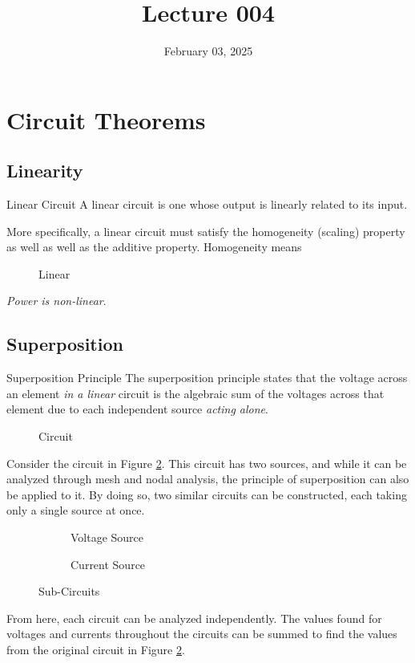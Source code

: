 \documentclass[12pt]{article}
\title{Lecture 004}
\date{February 03, 2025}
\begin{document}
\newpage
\section{Circuit Theorems}
\label{sec:circuitTheorems}

\subsection{Linearity}
\label{ssec:linearity}

\begin{definition}{Linear Circuit}
  A linear circuit is one whose output is linearly related to its input.
\end{definition}

More specifically, a linear circuit must satisfy the homogeneity (scaling) property as well as well as the additive property. Homogeneity means

\begin{figure}[H]
  
  \caption{Linear}
  \label{fig:}
\end{figure}

\textit{Power is non-linear}.

\subsection{Superposition}
\label{ssec:superposition}

\begin{definition}{Superposition Principle}
  The superposition principle states that the voltage across an element \textit{in a linear} circuit is the algebraic sum of the voltages across that element due to each independent source \textit{acting alone}.
\end{definition}

\begin{figure}[H]
  \centering
  
  \caption{Circuit}
  \label{fig:011}
\end{figure}
Consider the circuit in Figure \ref{fig:011}. This circuit has two sources, and while it can be analyzed through mesh and nodal analysis, the principle of superposition can also be applied to it. By doing so, two similar circuits can be constructed, each taking only a single source at once.
\begin{figure}[H]
  \centering
  \begin{subfigure}[H]{0.45\textwidth}
    \centering
    
    \caption{Voltage Source}
    \label{fig:012}
  \end{subfigure}
  \begin{subfigure}[H]{0.45\textwidth}
    \centering
    
    \caption{Current Source}
    \label{fig:013}
  \end{subfigure}
  \caption{Sub-Circuits}
  \label{fig:subcircuits}
\end{figure}
From here, each circuit can be analyzed independently. The values found for voltages and currents throughout the circuits can be summed to find the values from the original circuit in Figure \ref{fig:011}.
\end{document}
